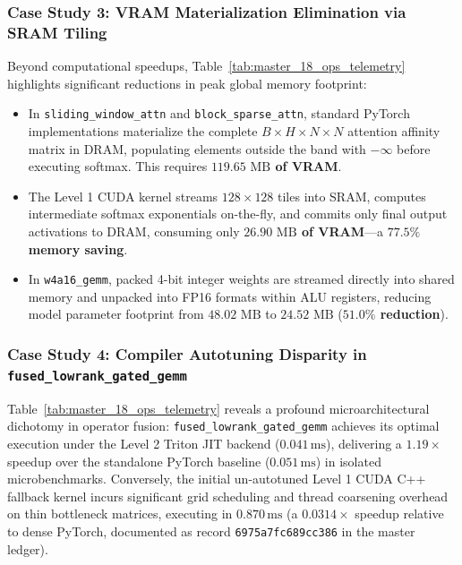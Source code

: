 \subsubsection{Case Study 3: VRAM Materialization Elimination via SRAM Tiling}
\label{sec:appendix_case_study_vram_savings}

Beyond computational speedups, Table~\ref{tab:master_18_ops_telemetry} highlights significant reductions in peak global memory footprint:
\begin{itemize}
    \item In \texttt{sliding\_window\_attn} and \texttt{block\_sparse\_attn}, standard PyTorch implementations materialize the complete $B \times H \times N \times N$ attention affinity matrix in DRAM, populating elements outside the band with $-\infty$ before executing softmax. This requires \textbf{$119.65\text{ MB}$ of VRAM}.
    \item The \neuralops{} Level 1 CUDA kernel streams $128 \times 128$ tiles into SRAM, computes intermediate softmax exponentials on-the-fly, and commits only final output activations to DRAM, consuming only \textbf{$26.90\text{ MB}$ of VRAM}---a \textbf{$77.5\%$ memory saving}.
    \item In \texttt{w4a16\_gemm}, packed 4-bit integer weights are streamed directly into shared memory and unpacked into FP16 formats within ALU registers, reducing model parameter footprint from $48.02\text{ MB}$ to $24.52\text{ MB}$ (\textbf{$51.0\%$ reduction}).
\end{itemize}

\subsubsection{Case Study 4: Compiler Autotuning Disparity in \texttt{fused\_lowrank\_gated\_gemm}}
\label{sec:appendix_case_study_fused_lowrank}

Table~\ref{tab:master_18_ops_telemetry} reveals a profound microarchitectural dichotomy in operator fusion: \texttt{fused\_lowrank\_gated\_gemm} achieves its optimal execution under the Level 2 Triton JIT backend ($0.041\,\text{ms}$), delivering a $1.19\times$ speedup over the standalone PyTorch baseline ($0.051\,\text{ms}$) in isolated microbenchmarks. Conversely, the initial un-autotuned Level 1 CUDA C++ fallback kernel incurs significant grid scheduling and thread coarsening overhead on thin bottleneck matrices, executing in $0.870\,\text{ms}$ (a $0.0314\times$ speedup relative to dense PyTorch, documented as record \texttt{6975a7fc689cc386} in the master ledger). 


